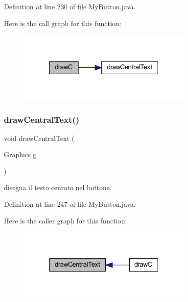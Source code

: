Definition at line 230 of file My\+Button.\+java.

Here is the call graph for this function\+:\nopagebreak
\begin{figure}[H]
\begin{center}
\leavevmode
\includegraphics[width=246pt]{classui_1_1_my_button_a56e66f982bfd587482db32cb63e608c4_cgraph}
\end{center}
\end{figure}
\mbox{\label{classui_1_1_my_button_a3a4d8b054f65915e3b9bfafe4228ad06}} 
\subsubsection{\texorpdfstring{draw\+Central\+Text()}{drawCentralText()}}
{\footnotesize\ttfamily void draw\+Central\+Text (\begin{DoxyParamCaption}\item[{Graphics}]{g }\end{DoxyParamCaption})\hspace{0.3cm}{\ttfamily [private]}}



disegna il testo cenrato nel bottone. 



Definition at line 247 of file My\+Button.\+java.

Here is the caller graph for this function\+:\nopagebreak
\begin{figure}[H]
\begin{center}
\leavevmode
\includegraphics[width=246pt]{classui_1_1_my_button_a3a4d8b054f65915e3b9bfafe4228ad06_icgraph}
\end{center}
\end{figure}
\mbox{\label{classui_1_1_my_button_a5d567e88f76d588ff4af3357a5db4f9c}} 
